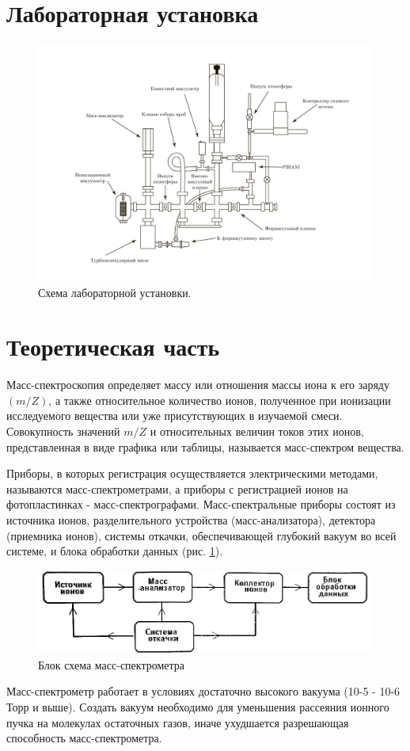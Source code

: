 \documentclass[a4paper, 12pt]{article}
\begin{document}
	\section{Лабораторная установка}
	\begin{figure}[h]
		\centering
		\includegraphics[scale=0.6]{MyGraph6.pdf}
		\caption{Схема лабораторной установки.}
	\end{figure}
	\newpage
	\section{Теоретическая часть}
	Масс-спектроскопия определяет массу или отношения массы иона к его заряду $(m/Z)$, а также относительное количество ионов, полученное при ионизации исследуемого вещества или уже присутствующих в изучаемой смеси. Совокупность значений $m/Z$ и относительных величин токов этих ионов, представленная в виде графика или таблицы, называется масс-спектром вещества.\par
	Приборы, в которых регистрация осуществляется электрическими методами, называются масс-спектрометрами, а приборы с регистрацией ионов на фотопластинках - масс-спектрографами. Масс-спектральные приборы состоят из источника ионов, разделительного устройства (масс-анализатора), детектора (приемника ионов), системы откачки, обеспечивающей глубокий вакуум во всей системе, и блока обработки данных (рис. \ref{idea}).\par
	\begin{figure}[h]
		\centering
		\includegraphics{idea.png}
		\caption{Блок схема масс-спектрометра}
		\label{idea}
	\end{figure}
	Масс-спектрометр работает в условиях достаточно высокого вакуума (10-5 - 10-6 Торр и выше). Создать вакуум необходимо для уменьшения рассеяния ионного пучка на молекулах остаточных газов, иначе ухудшается разрешающая способность масс-спектрометра.
\end{document}
